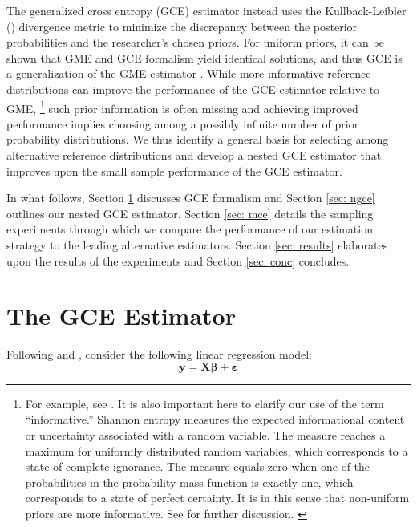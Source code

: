 \documentclass[english]{article}
\begin{document}
The generalized cross entropy (GCE) estimator instead uses the 
Kullback-Leibler (\citeyear{kullback1951}) divergence metric to minimize the 
discrepancy between the posterior probabilities and the researcher's chosen 
priors.
For uniform priors, it can be shown that GME and GCE formalism yield
identical solutions, and thus GCE is a generalization of the GME estimator
\citep{golan1996}.
While more informative reference distributions can improve the performance 
of the GCE estimator relative to GME,%
\footnote{For example, see \citet{heckelei2003}. 
It is also important here to clarify our use of the term ``informative.''
Shannon entropy measures the expected informational content or 
uncertainty associated with a random variable.
The measure reaches a maximum for uniformly distributed random 
variables, which corresponds to a state of complete ignorance.
The measure equals zero when one of the probabilities in the probability 
mass function is exactly one, which corresponds to a state of perfect 
certainty.
It is in this sense that non-uniform priors are more informative.
See \citet{golan2008} for further discussion. \label{fn: info}}
such prior information is often missing and achieving improved performance 
implies choosing among a possibly infinite number of prior probability 
distributions.
We thus identify a general basis for selecting among alternative reference 
distributions and develop a nested GCE estimator that improves 
upon the small sample performance of the GCE estimator. 

In what follows, Section \ref{sec: gce} discusses GCE formalism and 
Section \ref{sec: ngce} outlines our nested GCE estimator.
Section \ref{sec: mce} details the sampling experiments through which we
compare the performance of our estimation strategy to the leading 
alternative estimators.
Section \ref{sec: results} elaborates upon the results of the 
experiments and Section \ref{sec: conc} concludes. 


\section{The GCE Estimator}
\label{sec: gce}

Following \cite{golan1996} and \citet{golan2008}, consider the following 
linear regression model: 
\begin{equation}
\mathbf{y} = \mathbf{X\beta} + \mathbf{\varepsilon}
\end{equation}
\end{document}
